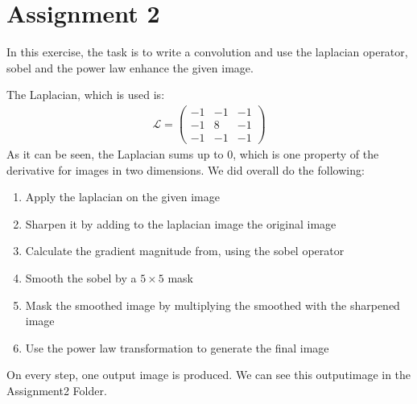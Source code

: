 \section{Assignment 2}

In this exercise, the task is to write a convolution and use the laplacian operator, sobel and the power law enhance the given image.

The Laplacian, which is used is:
\begin{gather*}
\mathcal{L} = \left( \begin{array}{ccc}
-1 & -1 & -1\\
-1 &  8 & -1\\
-1 & -1 & -1
\end{array} \right)
\end{gather*}
As it can be seen, the Laplacian sums up to 0, which is one property of the derivative for images in two dimensions.
We did overall do the following:
\begin{enumerate}
\item Apply the laplacian on the given image
\item Sharpen it by adding to the laplacian image the original image
\item Calculate the gradient magnitude from, using the sobel operator
\item Smooth the sobel by a $5 \times 5$ mask
\item Mask the smoothed image by multiplying the smoothed with the sharpened image
\item Use the power law transformation to generate the final image
\end{enumerate}
On every step, one output image is produced. We can see this outputimage in the Assignment2 Folder.

\begin{figure*}[ht!]
    \centering
 ~
 ~
 ~
 ~
\end{figure*}



